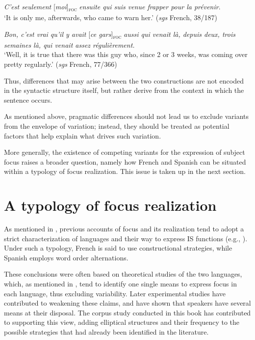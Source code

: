 \ea \label{ex:6:2} 
 \textit{C'est seulement} {[\textit{moi}}]\textsubscript{\textsc{foc}} \normalsize \textit{ensuite qui suis venue frapper pour la prévenir}.\\  
`It is only me, afterwards, who came to warn her.' \hfill (\textit{sgs} French, 38/187)   
\z

\ea \label{ex:6:3}
\textit{Bon, c'est vrai qu'il y avait} {[\textit{ce gars}}]\textsubscript{\textsc{foc}} \normalsize \textit{aussi qui venait là, depuis deux, trois semaines là, qui venait assez régulièrement.}\\
`Well, it is true that there was this guy who, since 2 or 3 weeks, was coming over pretty regularly.' \hfill (\textit{sgs} French, 77/366)  
\z

Thus, differences that may arise between the two constructions are not encoded in the syntactic structure itself, but rather derive from the context in which the sentence occurs. 

As mentioned above, pragmatic differences should not lead us to exclude variants from the envelope of variation; instead, they should be treated as potential factors that help explain what drives such variation.

More generally, the existence of competing variants for the expression of subject focus raises a broader question, namely how French and Spanish can be situated within a typology of focus realization. This issue is taken up in the next section.

\section{A typology of focus realization} \label{sub:7.3}
As mentioned in , previous accounts of focus and its realization tend to adopt a strict characterization of languages and their way to express IS functions (e.g., \cite{lambrecht1996information}). Under such a typology, French is said to use constructional strategies, while Spanish employs word order alternations. 

\hspace*{-.4pt}These conclusions were often based on theoretical studies of the two languages, which, as mentioned in , tend to identify one single means to express focus in each language, thus excluding variability. Later experimental studies have contributed to weakening these claims, and have shown that speakers have several means at their disposal. The corpus study conducted in this book has contributed to supporting this view, adding elliptical structures and their frequency to the possible strategies that had already been identified in the literature.

